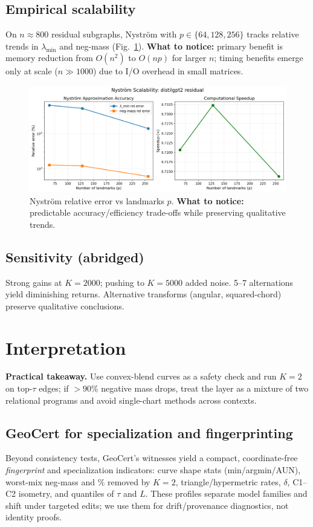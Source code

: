 \documentclass[11pt]{article}
\newcommand{\1}{\mathbf{1}}
\begin{document}
\subsection{Empirical scalability}
On $n\!\approx\!800$ residual subgraphs, Nyström with $p\in\{64,128,256\}$ tracks relative trends in $\lambda_{\min}$ and neg-mass (Fig.~\ref{fig:nystrom}). \textbf{What to notice:} primary benefit is memory reduction from $O(n^2)$ to $O(np)$ for larger $n$; timing benefits emerge only at scale ($n \gg 1000$) due to I/O overhead in small matrices.

\begin{figure}[h!]
\centering
\includegraphics[width=0.8\linewidth]{figs/nystrom_relerr_distilgpt2_residual.png}
\caption{Nyström relative error vs landmarks $p$. \textbf{What to notice:} predictable accuracy/efficiency trade-offs while preserving qualitative trends.}
\label{fig:nystrom}
\end{figure}

\subsection{Sensitivity (abridged)}
Strong gains at $K{=}2000$; pushing to $K{=}5000$ added noise. 5--7 alternations yield diminishing returns. Alternative transforms (angular, squared-chord) preserve qualitative conclusions.

\section{Interpretation}
\textbf{Practical takeaway.} Use convex-blend curves as a safety check and run $K{=}2$ on top-$\tau$ edges; if $>90\%$ negative mass drops, treat the layer as a mixture of two relational programs and avoid single-chart methods across contexts.

\subsection*{GeoCert for specialization and fingerprinting}
Beyond consistency tests, GeoCert's witnesses yield a compact, coordinate-free \emph{fingerprint} and specialization indicators: curve shape stats (min/argmin/AUN), worst-mix neg-mass and \% removed by $K{=}2$, triangle/hypermetric rates, $\delta$, C1--C2 isometry, and quantiles of $\tau$ and $L$. These profiles separate model families and shift under targeted edits; we use them for drift/provenance diagnostics, not identity proofs.
\end{document}
